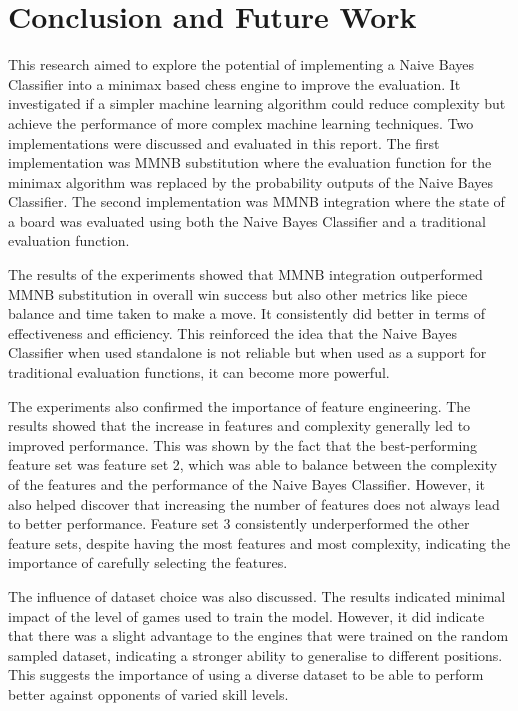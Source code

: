\chapter{Conclusion and Future Work}

This research aimed to explore the potential of implementing a Naive Bayes Classifier into a minimax based chess engine to improve the evaluation. It investigated if a simpler machine learning algorithm could reduce complexity but achieve the performance of more complex machine learning techniques. Two implementations were discussed and evaluated in this report. The first implementation was MMNB substitution where the evaluation function for the minimax algorithm was replaced by the probability outputs of the Naive Bayes Classifier. The second implementation was MMNB integration where the state of a board was evaluated using both the Naive Bayes Classifier and a traditional evaluation function. 

The results of the experiments showed that MMNB integration outperformed MMNB substitution in overall win success but also other metrics like piece balance and time taken to make a move. It consistently did better in terms of effectiveness and efficiency. This reinforced the idea that the Naive Bayes Classifier when used standalone is not reliable but when used as a support for traditional evaluation functions, it can become more powerful.

The experiments also confirmed the importance of feature engineering. The results showed that the increase in features and complexity generally led to improved performance. This was shown by the fact that the best-performing feature set was feature set 2, which was able to balance between the complexity of the features and the performance of the Naive Bayes Classifier. However, it also helped discover that increasing the number of features does not always lead to better performance. Feature set 3 consistently underperformed the other feature sets, despite having the most features and most complexity, indicating the importance of carefully selecting the features. 

The influence of dataset choice was also discussed. The results indicated minimal impact of the level of games used to train the model. However, it did indicate that there was a slight advantage to the engines that were trained on the random sampled dataset, indicating a stronger ability to generalise to different positions. This suggests the importance of using a diverse dataset to be able to perform better against opponents of varied skill levels.  

